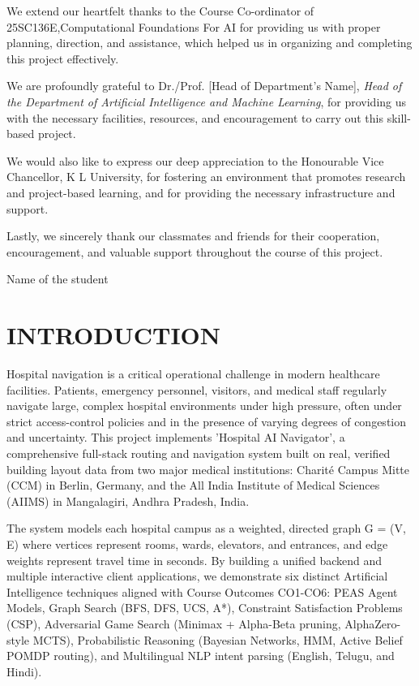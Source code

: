 \documentclass[12pt,a4paper]{report}
\begin{document}
We extend our heartfelt thanks to the Course Co-ordinator of 25SC136E,Computational Foundations For AI for providing us with proper planning, direction, and assistance, which helped us in organizing and completing this project effectively.

We are profoundly grateful to Dr./Prof. [Head of Department's Name], \textit{Head of the Department of Artificial Intelligence and Machine Learning}, for providing us with the necessary facilities, resources, and encouragement to carry out this skill-based project.

We would also like to express our deep appreciation to the Honourable Vice Chancellor, K L University, for fostering an environment that promotes research and project-based learning, and for providing the necessary infrastructure and support.

Lastly, we sincerely thank our classmates and friends for their cooperation, encouragement, and valuable support throughout the course of this project.

\vspace{1.5cm}
\begin{flushright}
Name of the student
\end{flushright}

\newpage

\chapter{INTRODUCTION}


Hospital navigation is a critical operational challenge in modern healthcare facilities. Patients, emergency personnel, visitors, and medical staff regularly navigate large, complex hospital environments under high pressure, often under strict access-control policies and in the presence of varying degrees of congestion and uncertainty. This project implements 'Hospital AI Navigator', a comprehensive full-stack routing and navigation system built on real, verified building layout data from two major medical institutions: Charit\'{e} Campus Mitte (CCM) in Berlin, Germany, and the All India Institute of Medical Sciences (AIIMS) in Mangalagiri, Andhra Pradesh, India.

The system models each hospital campus as a weighted, directed graph G = (V, E) where vertices represent rooms, wards, elevators, and entrances, and edge weights represent travel time in seconds. By building a unified backend and multiple interactive client applications, we demonstrate six distinct Artificial Intelligence techniques aligned with Course Outcomes CO1-CO6: PEAS Agent Models, Graph Search (BFS, DFS, UCS, A*), Constraint Satisfaction Problems (CSP), Adversarial Game Search (Minimax + Alpha-Beta pruning, AlphaZero-style MCTS), Probabilistic Reasoning (Bayesian Networks, HMM, Active Belief POMDP routing), and Multilingual NLP intent parsing (English, Telugu, and Hindi).
\end{document}
